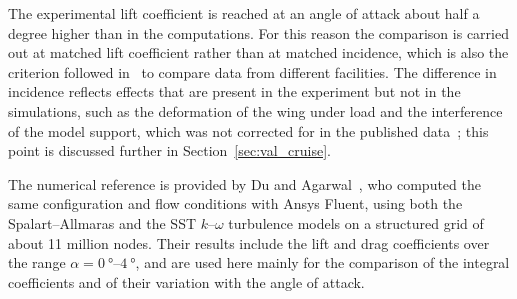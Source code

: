 The experimental lift coefficient is reached at an angle of attack about half a degree higher than in the computations. For this reason the comparison is carried out at matched lift coefficient rather than at matched incidence, which is also the criterion followed in~\cite{rivers2015} to compare data from different facilities. The difference in incidence reflects effects that are present in the experiment but not in the simulations, such as the deformation of the wing under load and the interference of the model support, which was not corrected for in the published data~\cite{rivers2015}; this point is discussed further in Section~\ref{sec:val_cruise}.

The numerical reference is provided by Du and Agarwal~\cite{du2017}, who computed the same configuration and flow conditions with Ansys Fluent, using both the Spalart--Allmaras and the SST $k$--$\omega$ turbulence models on a structured grid of about 11 million nodes. Their results include the lift and drag coefficients over the range $\alpha = \SIrange{0}{4}{\degree}$, and are used here mainly for the comparison of the integral coefficients and of their variation with the angle of attack.
